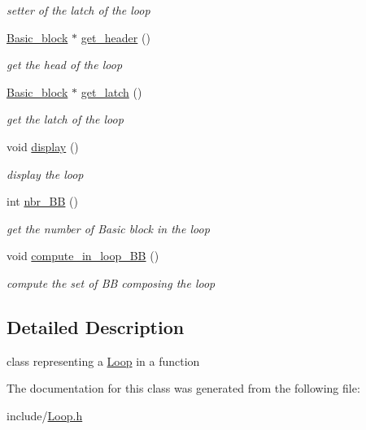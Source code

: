 \begin{DoxyCompactItemize}
\begin{DoxyCompactList}\small\item\em setter of the latch of the loop \end{DoxyCompactList}\item 
\mbox{\label{class_loop_a3bd41bfb89e48a857327021a7584ea0e}} 
\mbox{\hyperlink{class_basic__block}{Basic\+\_\+block}} $\ast$ \mbox{\hyperlink{class_loop_a3bd41bfb89e48a857327021a7584ea0e}{get\+\_\+header}} ()
\begin{DoxyCompactList}\small\item\em get the head of the loop \end{DoxyCompactList}\item 
\mbox{\label{class_loop_ad8393fca8e80d2cb152f6ed9cbfa9ef9}} 
\mbox{\hyperlink{class_basic__block}{Basic\+\_\+block}} $\ast$ \mbox{\hyperlink{class_loop_ad8393fca8e80d2cb152f6ed9cbfa9ef9}{get\+\_\+latch}} ()
\begin{DoxyCompactList}\small\item\em get the latch of the loop \end{DoxyCompactList}\item 
\mbox{\label{class_loop_a9c19796af1e978d32f80efc48035b061}} 
void \mbox{\hyperlink{class_loop_a9c19796af1e978d32f80efc48035b061}{display}} ()
\begin{DoxyCompactList}\small\item\em display the loop \end{DoxyCompactList}\item 
\mbox{\label{class_loop_a333d1ba3bf5e448f7cd958c6d39beec2}} 
int \mbox{\hyperlink{class_loop_a333d1ba3bf5e448f7cd958c6d39beec2}{nbr\+\_\+\+BB}} ()
\begin{DoxyCompactList}\small\item\em get the number of Basic block in the loop \end{DoxyCompactList}\item 
\mbox{\label{class_loop_a5ec7079fa8bbce34a18b41b768d3a118}} 
void \mbox{\hyperlink{class_loop_a5ec7079fa8bbce34a18b41b768d3a118}{compute\+\_\+in\+\_\+loop\+\_\+\+BB}} ()
\begin{DoxyCompactList}\small\item\em compute the set of BB composing the loop \end{DoxyCompactList}\end{DoxyCompactItemize}


\subsection{Detailed Description}
class representing a \mbox{\hyperlink{class_loop}{Loop}} in a function 

The documentation for this class was generated from the following file\+:\begin{DoxyCompactItemize}
\item 
include/\mbox{\hyperlink{_loop_8h}{Loop.\+h}}\end{DoxyCompactItemize}
